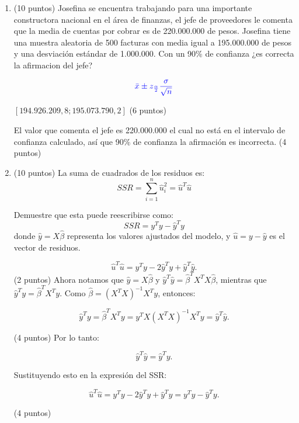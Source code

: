 \documentclass[10pt,a4paper]{article}
\begin{document}
\begin{enumerate}
\item  (10 puntos) Josefina se encuentra trabajando para una importante constructora nacional en el \'area de finanzas, el jefe de
proveedores le comenta que la media de cuentas por cobrar es de 220.000.000 de pesos. Josefina tiene una  muestra aleatoria de 500 facturas con media igual a 195.000.000 de pesos y una desviaci\'on
est\'andar de 1.000.000. Con un 90\% de confianza ¿es correcta la afirmacion del jefe?


    $$\color{blue}{\bar{x} \pm z_{\frac{\alpha}{2}}\frac{\sigma}{\sqrt{n}}}$$

{\color{blue}$[194.926.209,8 ; 195.073.790,2]$ (6 puntos)}


   {\color{blue}  El valor que comenta el jefe es 220.000.000 el cual no está en el intervalo de confianza calculado, así que  90\% de confianza la afirmación es incorrecta. (4 puntos)}

\item (10 puntos) La  suma de cuadrados de los residuos es:
    \[
    SSR = \sum_{i=1}^{n} \hat{u}_i^2 = \hat{u}^T \hat{u}
    \]
    
Demuestre que esta puede reescribirse como:
    \[
    SSR = y^T y - \hat{y}^T y
    \]
    donde \( \hat{y} = X \hat{\beta} \) representa los valores ajustados del modelo, y \( \hat{u} = y - \hat{y} \) es el vector de residuos.

{\color{blue}  \[
\hat{u}^T \hat{u} = y^T y - 2 \hat{y}^T y + \hat{y}^T \hat{y}.
\]
(2 puntos)
Ahora notamos que \( \hat{y} = X \hat{\beta} \) y \( \hat{y}^T \hat{y} = \hat{\beta}^T X^T X \hat{\beta} \), mientras que \( \hat{y}^T y = \hat{\beta}^T X^T y \). Como \( \hat{\beta} = (X^T X)^{-1} X^T y \), entonces:

\[
\hat{y}^T y = \hat{\beta}^T X^T y = y^T X (X^T X)^{-1} X^T y = \hat{y}^T \hat{y}.
\]

(4 puntos)
Por lo tanto:

\[
\hat{y}^T \hat{y} = \hat{y}^T y.
\]


Sustituyendo esto en la expresión del SSR:

\[
\hat{u}^T \hat{u} = y^T y - 2 \hat{y}^T y + \hat{y}^T y = y^T y - \hat{y}^T y.
\]

(4 puntos)
}
\end{enumerate}
\end{document}

